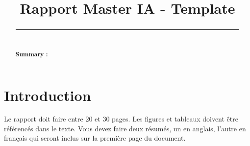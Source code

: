 \documentclass{rapportCS}
\title{Rapport Master IA - Template} %
\begin{document}








        
\fairemarges %
\fairepagedegarde %

\begin{center}
	\begin{abstract}
        \lipsum[1]
        \rule{\linewidth}{0.2 mm} \\[0.4 cm]
        \begin{center}\textbf{Summary :}\end{center} 
        \lipsum[2]
    \end{abstract}
\end{center}
\newpage


\tabledematieres %




\section{Introduction} 
Le rapport doit faire entre 20 et 30 pages. Les figures et tableaux doivent être référencés dans le texte. 
Vous devez faire deux résumés, un en anglais, l'autre en français qui seront inclus sur la première page du document.
\end{document}
